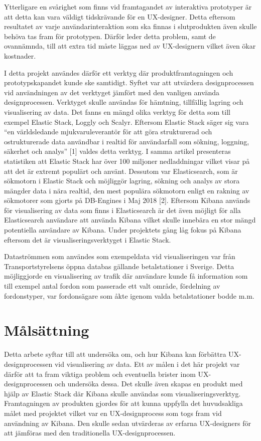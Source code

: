\documentclass[12pt]{kththesis}
\begin{document}
Ytterligare en svårighet som finns vid framtagandet av interaktiva prototyper är att detta kan vara väldigt tidskrävande för en UX-designer. Detta eftersom resultatet av varje användarinteraktion som ska finnas i slutprodukten även skulle behöva tas fram för prototypen. Därför leder detta problem, samt de ovannämnda, till att extra tid måste läggas ned av UX-designern vilket även ökar kostnader. 

I detta projekt användes därför ett verktyg där produktframtagningen och prototypskapandet kunde ske samtidigt. Syftet var att utvärdera designprocessen vid användningen av det verktyget jämfört med den vanligen använda designprocessen. Verktyget skulle användas för hämtning, tillfällig lagring och visualisering av data. Det fanns en mängd olika verktyg för detta som till exempel Elastic Stack, Loggly och Scalyr. Eftersom Elastic Stack säger sig vara “en världsledande mjukvaruleverantör för att göra strukturerad och ostrukturerade data användbar i realtid för användarfall som sökning, loggning, säkerhet och analys” [1] valdes detta verktyg. I samma artikel presenteras statistiken att Elastic Stack har över 100 miljoner nedladdningar vilket visar på att det är extremt populärt och använt. Dessutom var Elasticsearch, som är sökmotorn i Elastic Stack och möjliggör lagring, sökning och analys av stora mängder data i nära realtid, den mest populära sökmotorn enligt en rakning av sökmotorer som gjorts på DB-Engines i Maj 2018 [2]. Eftersom Kibana används för visualisering av data som finns i Elasticsearch är det även möjligt för alla Elasticsearch användare att använda Kibana vilket skulle innebära en stor mängd potentiella användare av Kibana. Under projektets gång låg fokus på Kibana eftersom det är visualiseringsverktyget i Elastic Stack.

Dataströmmen som användes som exempeldata vid visualiseringen var från Transportstyrelsens öppna databas gällande betalstationer i Sverige. Detta möjliggjorde en visualisering av trafik där användare kunde få information som till exempel antal fordon som passerade ett valt område, fördelning av fordonstyper, var fordonsägare som åkte igenom valda betalstationer bodde m.m.

\section{Målsättning}
Detta arbete syftar till att undersöka om, och hur Kibana kan förbättra UX-designprocessen vid visualisering av data. Ett av målen i det här projekt var därför att ta fram viktiga problem och eventuella brister inom UX-designprocessen och undersöka dessa. Det skulle även skapas en produkt med hjälp av Elastic Stack där Kibana skulle användas som visualiseringsverktyg. Framtagningen av produkten gjordes för att kunna uppfylla det huvudsakliga målet med projektet vilket var en UX-designprocess som togs fram vid användning av Kibana. Den skulle sedan utvärderas av erfarna UX-designers för att jämföras med den traditionella UX-designprocessen. 
\end{document}

